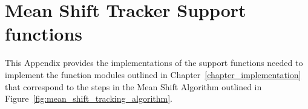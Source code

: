 \appendix
\chapter{Mean Shift Tracker Support functions} \label{appendix_A}
This Appendix provides the implementations of the support functions needed to
implement the function modules outlined in Chapter~\ref{chapter_implementation}
that correspond to the steps in the Mean Shift Algorithm outlined in
Figure~\ref{fig:mean_shift_tracking_algorithm}.

